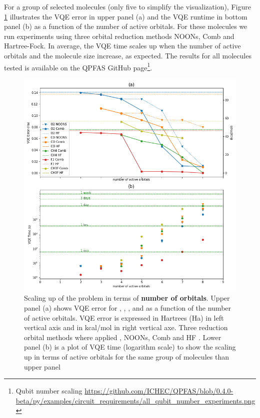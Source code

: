 \documentclass[journal,onecolumn]{IEEEtran}
\begin{document}
For a group of selected molecules (only five to simplify the visualization), Figure \ref{fig:qubit_number_active_orbitals} illustrates the VQE error in upper panel (a) and the VQE runtime in bottom panel (b) as a function of the number of active orbitals. 
For these molecules we run experiments using three orbital reduction methods NOONs, Comb and Hartree-Fock. 
In average, the VQE time scales up when the number of active orbitals and the molecule size increase, as expected. 
The results for all molecules tested is available on the QPFAS GitHub page\footnote{Qubit number scaling \url{https://github.com/ICHEC/QPFAS/blob/0.4.0-beta/py/examples/circuit_requirements/all_qubit_number_experiments.png}}.
\begin{figure}[!htb]
\centering
\includegraphics[width=\textwidth]{qubit_number_experiments.png}
\caption{Scaling up of the problem in terms of \textbf{number of orbitals}. Upper panel (a) shows VQE error for , , ,  and  as a function of the number of active orbitals. VQE error is expressed in Hartrees (Ha) in left vertical axis and in kcal/mol in right vertical axe. Three reduction orbital methods where applied , NOONs, Comb and HF . Lower panel (b) is a plot of VQE time (logarithm scale) to show the scaling up in terms of active orbitals for the same group of molecules than upper panel}
\label{fig:qubit_number_active_orbitals}
\end{figure}
\end{document}
